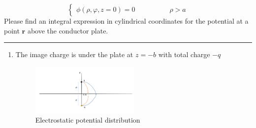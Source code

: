 \documentclass[a4paper,11pt]{article}
\begin{document}
\begin{enumerate}
\begin{enumerate}
\begin{equation}
\begin{cases}
                \phi(\rho,\varphi,z=0)=0\quad\quad\quad\quad\quad \rho>a
            \end{cases}
        \end{equation}
        Please find an integral expression in cylindrical coordinates for the potential at a point $\boldsymbol{r}$ above the conductor plate.
    \end{enumerate}
    \rule[0pt]{6cm}{0.05em}
    \begin{enumerate}
        \item The image charge is under the plate at $z=-b$ with total charge $-q$
        \begin{figure}[h]
            \centering
            \includegraphics[width=0.5\textwidth]{fig2.png}\caption{Electrostatic potential distribution}
        \end{figure}
        

\end{enumerate}
\end{enumerate}
\end{document}
